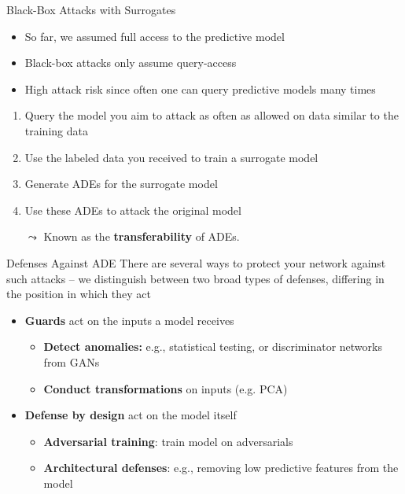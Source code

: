 \documentclass[10pt,compress,t,notes=noshow, xcolor=table]{beamer}
\begin{document}
\begin{frame}[c]{Black-Box Attacks with Surrogates }

\begin{itemize}
    \item So far, we assumed full access to the predictive model
    \item Black-box attacks only assume query-access
    \item High attack risk since often one can query predictive models many times
\end{itemize}

\medskip
\begin{enumerate}
    \item Query the model you aim to attack as often as allowed on data similar to the training data
    \item Use the labeled data you received to train a surrogate model
    \item Generate ADEs for the surrogate model
    \item Use these ADEs to attack the original model
\end{enumerate}

\medskip
\begin{itemize}
    \item[$\leadsto$] Known as the \textbf{transferability} of ADEs.
\end{itemize}



\end{frame}

\begin{frame}[c]{Defenses Against ADE}
There are several ways to protect your network against such attacks -- we distinguish between two broad types of defenses, differing in the position in which they act
\begin{itemize}
    \item \textbf{Guards} act on the inputs a model receives
    \begin{itemize}
        \item \textbf{Detect anomalies:} e.g., statistical testing, or discriminator networks from GANs
        \item \textbf{Conduct transformations} on inputs (e.g. PCA)
    \end{itemize}
    \item \textbf{Defense by design} act on the model itself
    \begin{itemize}
        \item \textbf{Adversarial training}: train model on adversarials
        \item \textbf{Architectural defenses}: e.g., removing low predictive features from the model
    \end{itemize}
\end{itemize}
\end{frame}
\end{document}
